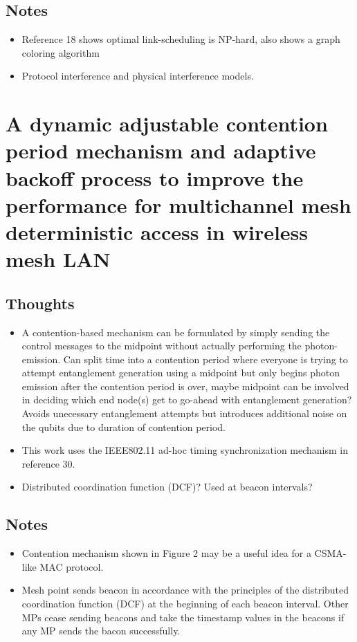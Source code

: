\documentclass{article}
\begin{document}
\subsection{Notes}
\begin{itemize}
    \item Reference 18 shows optimal link-scheduling is NP-hard, also shows a graph coloring algorithm
    \item Protocol interference and physical interference models.
\end{itemize}

\section{A dynamic adjustable contention period mechanism and adaptive backoff process to improve the performance for multichannel mesh deterministic access in wireless mesh LAN}

\subsection{Thoughts}
\begin{itemize}
    \item A contention-based mechanism can be formulated by simply sending the control messages to the midpoint without actually performing the photon-emission.  Can split time into a contention period where everyone is trying to attempt entanglement generation using a midpoint but only begins photon emission after the contention period is over, maybe midpoint can be involved in deciding which end node(s) get to go-ahead with entanglement generation?  Avoids unecessary entanglement attempts but introduces additional noise on the qubits due to duration of contention period.
    \item This work uses the IEEE802.11 ad-hoc timing synchronization mechanism in reference 30.
    \item Distributed coordination function (DCF)?  Used at beacon intervals?
\end{itemize}

\subsection{Notes}
\begin{itemize}
    \item Contention mechanism shown in Figure 2 may be a useful idea for a CSMA-like MAC protocol.
    \item Mesh point sends beacon in accordance with the principles of the distributed coordination function (DCF) at the beginning of each beacon interval.  Other MPs cease sending beacons and take the timestamp values in the beacons if any MP sends the bacon successfully.
\end{itemize}
\end{document}
